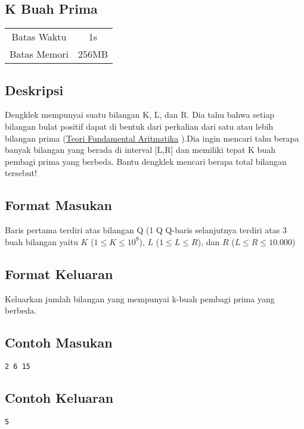 \documentclass{article}
\begin{document}
\begin{center}

    
    \section*{K Buah Prima} %

    \begin{tabular}{ | c c | }
        \hline
        Batas Waktu  & 1s \\    %
        Batas Memori & 256MB \\  %
        \hline
    \end{tabular}
\end{center}

\subsection*{Deskripsi}
Dengklek mempunyai suatu bilangan K, L, dan R. Dia tahu bahwa setiap bilangan bulat positif dapat di bentuk dari perkalian dari satu atau lebih bilangan prima (\href{https://mathworld.wolfram.com/FundamentalTheoremofArithmetic.html}{Teori Fundamental Aritmatika} ).Dia ingin mencari tahu berapa banyak bilangan yang berada di interval [L,R] dan memiliki tepat K buah pembagi prima yang berbeda. Bantu dengklek mencari berapa total bilangan tersebut!

\subsection*{Format Masukan}

Baris pertama terdiri atas bilangan Q (1 \leq Q 
Q-baris selanjutnya terdiri atas 3 buah bilangan yaitu $K$ ($1 \leq K \leq 10^9$), $L$ ($1 \leq L \leq R$), dan $R$ ($L \leq R \leq 10.000$)

\subsection*{Format Keluaran}

Keluarkan jumlah bilangan yang mempunyai k-buah pembagi prima yang berbeda.
\\

\begin{multicols}{2}
\subsection*{Contoh Masukan}
\begin{lstlisting}
2 6 15
\end{lstlisting}
\columnbreak
\subsection*{Contoh Keluaran}
\begin{lstlisting}
5
\end{lstlisting}
\vfill
\null
\end{multicols}
\end{document}
